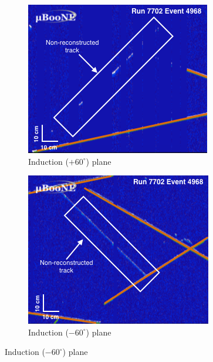 \documentclass[a4paper,11pt]{article}
\begin{document}
\begin{figure}[htbp]
  \begin{center}
    \begin{subfigure}{0.5\textwidth}
      \includegraphics[width=\linewidth]{figures/u.png}
      \caption{Induction ($+60^{\circ}$) plane} \label{fig:u}
    \end{subfigure}
    \begin{subfigure}{0.5\textwidth}
      \includegraphics[width=\linewidth]{figures/v.png}
      \caption{Induction ($-60^{\circ}$) plane} \label{fig:v}
    \end{subfigure}

\end{center}
\end{figure}
\end{document}
